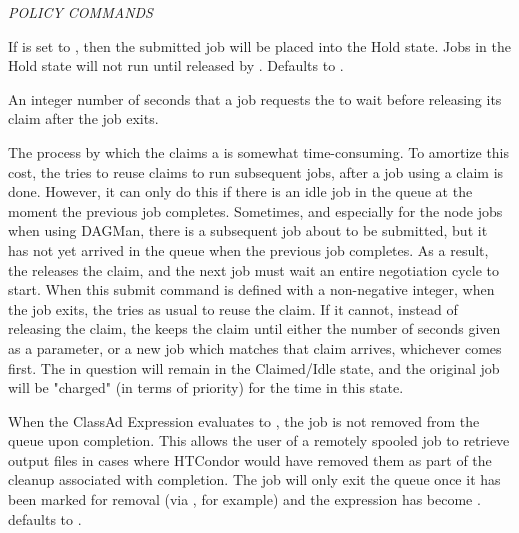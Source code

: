 \emph{POLICY COMMANDS}
\begin{description} 


\label{man-condor-submit-hold}
\item[hold = $<$True \Bar\ False$>$] 
If  is set to
, then the submitted job will be placed into the Hold state.
Jobs in the Hold state will not run until released by .
Defaults to .


\label{condor-submit-keep-claim-idle}
\item[keep\_claim\_idle = $<$integer$>$] 
An integer number of seconds
that a job requests the  to wait before releasing its
claim after the job exits.

The process by which the 
 claims a  is somewhat time-consuming.
To amortize this cost, the  tries to reuse claims
to run subsequent jobs, after a job using a claim is done.  
However,
it can only do this if there is an idle job in the queue at the moment
the previous job completes.
Sometimes, and especially for the node jobs when using DAGMan,
there is a subsequent job about to be submitted, 
but it has not yet arrived in the queue when the previous job completes.
As a result, the  releases the claim,
and the next job must wait an entire negotiation cycle to start.
When this submit command is defined with a non-negative integer,
when the job exits, the  tries as usual to reuse the claim.
If it cannot, instead of releasing the claim,
the  keeps the claim until either the number of seconds given
as a parameter, or a new job which matches that claim arrives, 
whichever comes first.  
The  in question will remain in the Claimed/Idle state,
and the original job will be "charged" (in terms of priority) for the time
in this state.


\label{condor-submit-leave-in-queue}
\item[leave\_in\_queue = $<$ClassAd Boolean Expression$>$]
When the ClassAd Expression evaluates to , the job is
not removed from the queue upon completion.
This allows the user of a remotely spooled job to retrieve output
files in cases where HTCondor would have removed them as part of
the cleanup associated with completion. The job will only exit
the queue once it has been marked for removal (via ,
for example) and the  expression has
become .
 defaults to .


\end{description}
